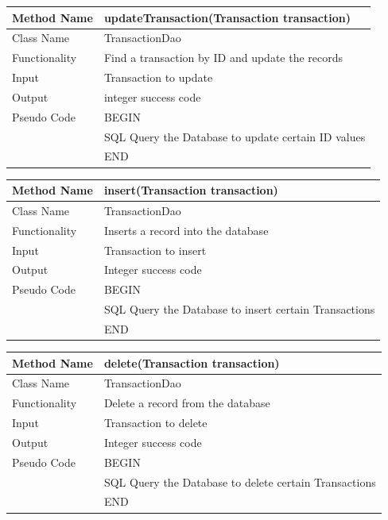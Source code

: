 \documentclass[12pt]{article}
\begin{document}
\begin{tabular}{ |p{3cm}||p{\colWidth}|  }
	\hline
	Method Name & updateTransaction(Transaction transaction)\\
	\hline
	Class Name & TransactionDao\\
	\hline
	Functionality & Find a transaction by ID and update the records\\
	\hline
	Input & Transaction to update\\
	\hline
	Output & integer success code\\
	\hline
	Pseudo Code& BEGIN\\ & SQL Query the Database to update certain ID values\\ & END \\
	\hline
\end{tabular}


\begin{tabular}{ |p{3cm}||p{\colWidth}|  }
	\hline
	Method Name & insert(Transaction transaction)\\
	\hline
	Class Name & TransactionDao\\
	\hline
	Functionality & Inserts a record into the database\\
	\hline
	Input & Transaction to insert\\
	\hline
	Output & Integer success code\\
	\hline
	Pseudo Code&BEGIN\\ & SQL Query the Database to insert certain Transactions\\ & END \\
	\hline
\end{tabular}



\begin{tabular}{ |p{3cm}||p{\colWidth}|  }
	\hline
	Method Name & delete(Transaction transaction)\\
	\hline
	Class Name & TransactionDao\\
	\hline
	Functionality & Delete a record from the database\\
	\hline
	Input & Transaction to delete\\
	\hline
	Output & Integer success code\\
	\hline
	Pseudo Code&BEGIN\\ & SQL Query the Database to delete certain Transactions\\&END\\
	\hline
\end{tabular}            

\pagebreak
\end{document}
